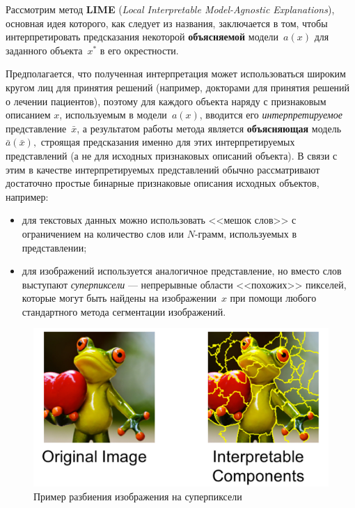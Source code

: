 \documentclass[12pt,a4paper]{article}
\begin{document}
	\par Рассмотрим метод \textbf{LIME} (\emph{Local Interpretable Model-Agnostic Explanations}), основная идея которого, как следует из названия, заключается в том, чтобы интерпретировать предсказания некоторой \textbf{объясняемой} модели~$a(x)$ для заданного объекта~$x^*$ в его окрестности.
	\par Предполагается, что полученная интерпретация может использоваться широким кругом лиц для принятия решений (например, докторами для принятия решений о лечении пациентов), поэтому для каждого объекта наряду с признаковым описанием $x$, используемым в модели~$a(x)$, вводится его \emph{интерпретируемое} представление~$\bar{x}$, а результатом работы метода является \textbf{объясняющая} модель~$\bar{a}(\bar{x}),$ строящая предсказания именно для этих интерпретируемых представлений (а не для исходных признаковых описаний объекта). В связи с этим в качестве интерпретируемых представлений обычно рассматривают достаточно простые бинарные признаковые описания исходных объектов, например:
	\begin{itemize}
		\item для текстовых данных можно использовать <<мешок слов>> с ограничением на количество слов или $N$-грамм, используемых в представлении;
		\item для изображений используется аналогичное представление, но вместо слов выступают \emph{суперпиксели} — непрерывные области <<похожих>> пикселей, которые могут быть найдены на изображении~$x$ при помощи любого стандартного метода сегментации изображений.
	\end{itemize}

	\begin{center}
	\begin{figure}[!htb]
		\centering
		\includegraphics[width=0.8\linewidth]{superpixels.jpg}
		\caption{Пример разбиения изображения на суперпиксели}
	\end{figure}
\end{center}
\end{document}

